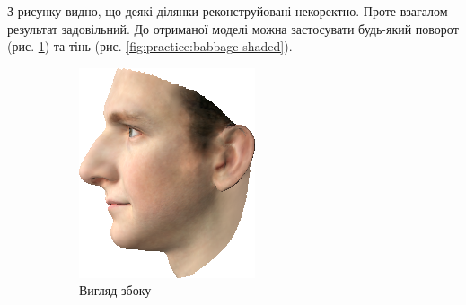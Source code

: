 З рисунку видно, що деякі ділянки реконструйовані некоректно.
Проте взагалом результат задовільний.
До отриманої моделі можна застосувати будь-який поворот
(рис. \ref{fig:practice:babbage-profile})
та тінь
(рис. \ref{fig:practice:babbage-shaded}).

\begin{figure}[h]
  \centering
  \begin{subfigure}[b]{0.3\textwidth}
    \centering
    \includegraphics[width=\textwidth]{images/babbage-profile}
    \caption{Вигляд збоку}
    \label{fig:practice:babbage-profile}
  \end{subfigure}
  \begin{subfigure}[b]{0.3\textwidth}
    \centering

\end{subfigure}
\end{figure}
